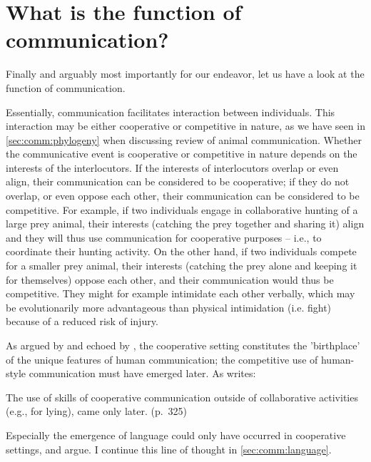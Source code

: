 \section{What is the function of communication?}
\label{sec:comm:function}

Finally and arguably most importantly for our endeavor, let us have a look at the function of communication.


Essentially, communication facilitates interaction between individuals.
This interaction may be either cooperative or competitive in nature, as we have seen in \cref{sec:comm:phylogeny} when discussing  review of animal communication.
Whether the communicative event is cooperative or competitive in nature depends on the interests of the interlocutors. If the interests of interlocutors overlap or even align, their communication can be considered to be cooperative; if they do not overlap, or even oppose each other, their communication can be considered to be competitive.
For example, if two individuals engage in collaborative hunting of a large prey animal, their interests (catching the prey together and sharing it) align and they will thus use communication for cooperative purposes -- i.e., to coordinate their hunting activity. On the other hand, if two individuals compete for a smaller prey animal, their interests (catching the prey alone and keeping it for themselves) oppose each other, and their communication would thus be competitive. They might for example intimidate each other verbally, which may be evolutionarily more advantageous than physical intimidation (i.e. fight) because of a reduced risk of injury.

As argued by \citet{Tomasello08, Tomasello09} and echoed by \citet{Dor17}, the cooperative setting constitutes the 'birthplace' of the unique features of human communication; the competitive use of human-style communication must have emerged later. As \citet{Tomasello08} writes:
\begin{quoting}
    The use of skills of cooperative communication outside of collaborative activities (e.g., for lying), came only later.
    \hfill (p.~325)
\end{quoting}
Especially the emergence of language could only have occurred in cooperative settings, \citet{Tomasello08} and \citet{Dor17} argue. I continue this line of thought in \cref{sec:comm:language}.

